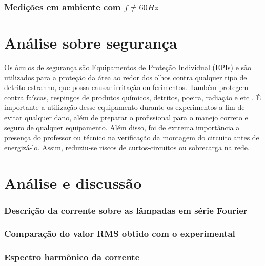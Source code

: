 \documentclass[a4paper,12pt,oneside,openany,table,xcdraw]{article}
\begin{document}
\subsubsection{Medições em ambiente com $f\ne 60Hz$}

\section{Análise sobre segurança} %
Os óculos de segurança são Equipamentos de Proteção Individual (EPIs) e são utilizados para a proteção da área ao redor dos olhos contra qualquer tipo de detrito estranho, que possa causar irritação ou ferimentos. Também protegem contra faíscas, respingos de produtos químicos, detritos, poeira, radiação e etc \cite{safe}.
É importante a utilização desse equipamento durante os experimentos a fim de evitar qualquer dano, além de preparar o profissional para o manejo correto e seguro de qualquer equipamento.
Além disso, foi de extrema importância a presença do professor ou técnico na verificação da montagem do circuito antes de energizá-lo. Assim, reduziu-se riscos de curtos-circuitos ou sobrecarga na rede.

\vspace{0.2cm}
\section{Análise e discussão} %
\subsubsection{Descrição da corrente sobre as lâmpadas em série Fourier}

\subsubsection{Comparação do valor RMS obtido com o experimental}

\subsubsection{Espectro harmônico da corrente}
\end{document}
